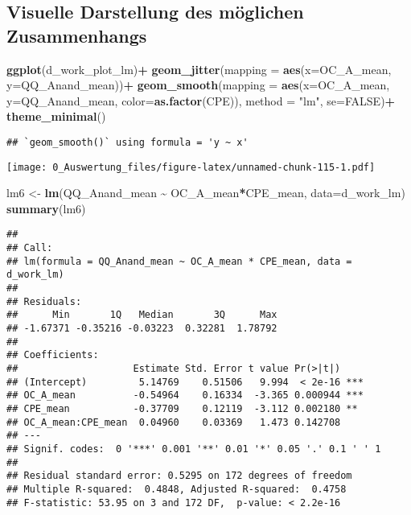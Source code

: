 \documentclass[
]{article}
\newenvironment{Shaded}{\begin{snugshade}}{\end{snugshade}}
\newcommand{\AttributeTok}[1]{\textcolor[rgb]{0.13,0.29,0.53}{#1}}
\newcommand{\ConstantTok}[1]{\textcolor[rgb]{0.56,0.35,0.01}{#1}}
\newcommand{\FunctionTok}[1]{\textcolor[rgb]{0.13,0.29,0.53}{\textbf{#1}}}
\newcommand{\NormalTok}[1]{#1}
\newcommand{\OtherTok}[1]{\textcolor[rgb]{0.56,0.35,0.01}{#1}}
\newcommand{\SpecialCharTok}[1]{\textcolor[rgb]{0.81,0.36,0.00}{\textbf{#1}}}
\newcommand{\StringTok}[1]{\textcolor[rgb]{0.31,0.60,0.02}{#1}}
\begin{document}
\subsection{Visuelle Darstellung des möglichen
Zusammenhangs}\label{visuelle-darstellung-des-muxf6glichen-zusammenhangs}

\begin{Shaded}
\begin{Highlighting}[]
\FunctionTok{ggplot}\NormalTok{(d\_work\_plot\_lm)}\SpecialCharTok{+}
  \FunctionTok{geom\_jitter}\NormalTok{(}\AttributeTok{mapping =} \FunctionTok{aes}\NormalTok{(}\AttributeTok{x=}\NormalTok{OC\_A\_mean, }\AttributeTok{y=}\NormalTok{QQ\_Anand\_mean))}\SpecialCharTok{+}
  \FunctionTok{geom\_smooth}\NormalTok{(}\AttributeTok{mapping =} \FunctionTok{aes}\NormalTok{(}\AttributeTok{x=}\NormalTok{OC\_A\_mean, }\AttributeTok{y=}\NormalTok{QQ\_Anand\_mean, }\AttributeTok{color=}\FunctionTok{as.factor}\NormalTok{(CPE)), }\AttributeTok{method =} \StringTok{"lm"}\NormalTok{, }\AttributeTok{se=}\ConstantTok{FALSE}\NormalTok{)}\SpecialCharTok{+}
  \FunctionTok{theme\_minimal}\NormalTok{()}
\end{Highlighting}
\end{Shaded}

\begin{verbatim}
## `geom_smooth()` using formula = 'y ~ x'
\end{verbatim}

\texttt{[image: 0\_Auswertung\_files/figure-latex/unnamed-chunk-115-1.pdf]}

\begin{Shaded}
\begin{Highlighting}[]
\NormalTok{lm6 }\OtherTok{\textless{}{-}} \FunctionTok{lm}\NormalTok{(QQ\_Anand\_mean }\SpecialCharTok{\textasciitilde{}}\NormalTok{ OC\_A\_mean}\SpecialCharTok{*}\NormalTok{CPE\_mean, }\AttributeTok{data=}\NormalTok{d\_work\_lm)}
\FunctionTok{summary}\NormalTok{(lm6)}
\end{Highlighting}
\end{Shaded}

\begin{verbatim}
## 
## Call:
## lm(formula = QQ_Anand_mean ~ OC_A_mean * CPE_mean, data = d_work_lm)
## 
## Residuals:
##      Min       1Q   Median       3Q      Max 
## -1.67371 -0.35216 -0.03223  0.32281  1.78792 
## 
## Coefficients:
##                    Estimate Std. Error t value Pr(>|t|)    
## (Intercept)         5.14769    0.51506   9.994  < 2e-16 ***
## OC_A_mean          -0.54964    0.16334  -3.365 0.000944 ***
## CPE_mean           -0.37709    0.12119  -3.112 0.002180 ** 
## OC_A_mean:CPE_mean  0.04960    0.03369   1.473 0.142708    
## ---
## Signif. codes:  0 '***' 0.001 '**' 0.01 '*' 0.05 '.' 0.1 ' ' 1
## 
## Residual standard error: 0.5295 on 172 degrees of freedom
## Multiple R-squared:  0.4848, Adjusted R-squared:  0.4758 
## F-statistic: 53.95 on 3 and 172 DF,  p-value: < 2.2e-16
\end{verbatim}
\end{document}
